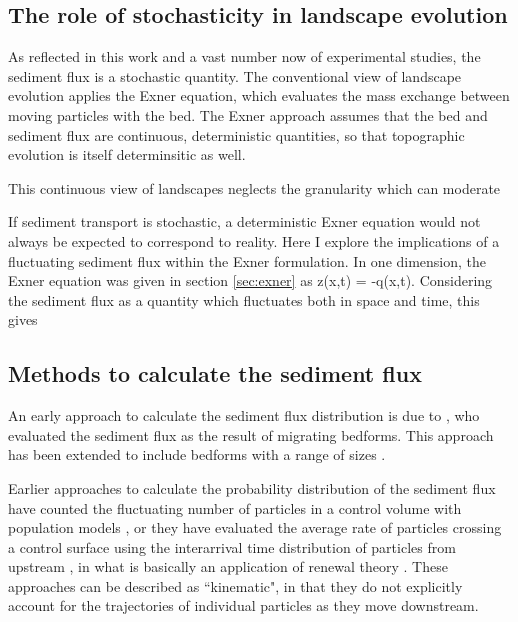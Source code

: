 \subsection{The role of stochasticity in landscape evolution}

As reflected in this work and a vast number now of experimental studies, the sediment flux is a stochastic quantity. 
The conventional view of landscape evolution applies the Exner equation, which evaluates the mass exchange between moving particles with the bed.
The Exner approach assumes that the bed and sediment flux are continuous, deterministic quantities, so that topographic evolution is itself determinsitic as well.

This continuous view of landscapes neglects the granularity which can moderate 

If sediment transport is stochastic, a deterministic Exner equation would not always be expected to correspond to reality.
Here I explore the implications of a fluctuating sediment flux within the Exner formulation.
In one dimension, the Exner equation was given in section \ref{sec:exner} as 
\be \pt z(x,t) = -\px q(x,t). \ee
Considering the sediment flux as a quantity which fluctuates both in space and time, this gives


\subsection{Methods to calculate the sediment flux}

An early approach to calculate the sediment flux distribution is due to \citet{Hamamori1962}, who evaluated the sediment flux as the result of migrating bedforms. This approach has been extended to include bedforms with a range of sizes \citep{Guala2014,Nikora1984}.

Earlier approaches to calculate the probability distribution of the sediment flux have counted the fluctuating number of particles in a control volume with population models \citep{Ancey2008,Ancey2014}, or they have evaluated the average rate of particles crossing a control surface using the interarrival time distribution of particles from upstream \citep{Turowski2010,Ancey2020,Heyman2013}, in what is basically an application of renewal theory \citep{Cox1962}.
These approaches can be described as ``kinematic", in that they do not explicitly account for the trajectories of individual particles as they move downstream.

